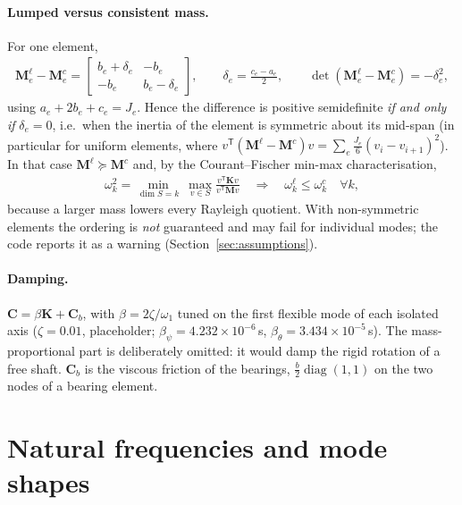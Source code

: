 \documentclass[10pt,a4paper]{article}
\numberwithin{equation}{section}
\begin{document}
\paragraph{Lumped versus consistent mass.} For one element,
\begin{gather}
\mathbf M_e^{\ell} - \mathbf M_e^{c} = \begin{bmatrix} b_e + \delta_e & -b_e \\ -b_e & b_e - \delta_e\end{bmatrix}, \qquad \delta_e = \frac{c_e - a_e}{2}, \qquad
\det\left(\mathbf M_e^{\ell} - \mathbf M_e^{c}\right) = -\delta_e^2 ,
\end{gather}
using $a_e + 2b_e + c_e = J_e$. Hence the difference is positive semidefinite \emph{if and only if} $\delta_e = 0$, i.e.\ when the inertia of the element is symmetric about its mid-span (in particular for uniform elements, where $v^{\mathsf T}(\mathbf M^{\ell}-\mathbf M^{c})v = \sum_e \frac{J_e}{6}(v_i - v_{i+1})^2$). In that case $\mathbf M^{\ell}\succeq\mathbf M^{c}$ and, by the Courant--Fischer min-max characterisation,
\begin{gather}
\omega_k^2 = \min_{\dim S = k}\ \max_{v\in S}\frac{v^{\mathsf T}\mathbf K v}{v^{\mathsf T}\mathbf M v}\quad\Longrightarrow\quad \omega_k^{\ell} \le \omega_k^{c}\quad\forall k,
\end{gather}
because a larger mass lowers every Rayleigh quotient. With non-symmetric elements the ordering is \emph{not} guaranteed and may fail for individual modes; the code reports it as a warning (Section~\ref{sec:assumptions}).
\paragraph{Damping.} $\mathbf C = \beta\mathbf K + \mathbf C_b$, with $\beta = 2\zeta/\omega_1$ tuned on the first flexible mode of each isolated axis ($\zeta = 0.01$, placeholder; $\beta_\psi = 4.232\times10^{-6}$\,s, $\beta_\theta = 3.434\times10^{-5}$\,s). The mass-proportional part is deliberately omitted: it would damp the rigid rotation of a free shaft. $\mathbf C_b$ is the viscous friction of the bearings, $\frac{b}{2}\operatorname{diag}(1,1)$ on the two nodes of a bearing element.
\section{Natural frequencies and mode shapes}\label{sec:eigen}
\end{document}
